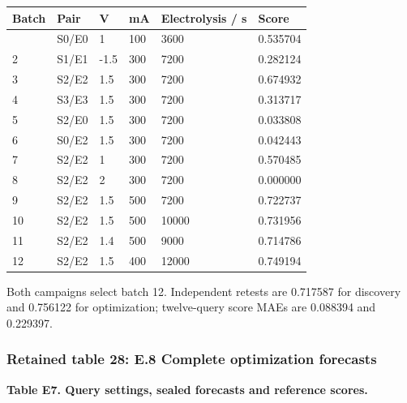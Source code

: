 \documentclass[10pt,a4paper]{article}
\begin{document}
{\def\LTcaptype{table} %
\small\begin{longtable}[]{@{}llllll@{}}
\toprule\noalign{}
Batch & Pair & V & mA & Electrolysis / s & Score \\
\midrule\noalign{}
\endhead
\bottomrule\noalign{}
\endlastfoot
1 & S0/E0 & 1 & 100 & 3600 & 0.535704 \\
2 & S1/E1 & -1.5 & 300 & 7200 & 0.282124 \\
3 & S2/E2 & 1.5 & 300 & 7200 & 0.674932 \\
4 & S3/E3 & 1.5 & 300 & 7200 & 0.313717 \\
5 & S2/E0 & 1.5 & 300 & 7200 & 0.033808 \\
6 & S0/E2 & 1.5 & 300 & 7200 & 0.042443 \\
7 & S2/E2 & 1 & 300 & 7200 & 0.570485 \\
8 & S2/E2 & 2 & 300 & 7200 & 0.000000 \\
9 & S2/E2 & 1.5 & 500 & 7200 & 0.722737 \\
10 & S2/E2 & 1.5 & 500 & 10000 & 0.731956 \\
11 & S2/E2 & 1.4 & 500 & 9000 & 0.714786 \\
12 & S2/E2 & 1.5 & 400 & 12000 & 0.749194 \\
\end{longtable}\normalsize
}

Both campaigns select batch 12. Independent retests are 0.717587 for discovery and 0.756122 for optimization; twelve-query score MAEs are 0.088394 and 0.229397.

\subsubsection{Retained table 28: E.8 Complete optimization forecasts}\label{retained-table-28-e.8-complete-optimization-forecasts}

\textbf{Table E7. Query settings, sealed forecasts and reference scores.}
\end{document}
